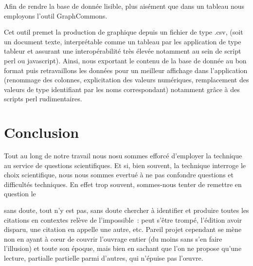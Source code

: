 \documentclass[12pt, a4paper]{article}
\begin{document}
Afin de rendre la base de donnée lisible, plus aisément que dans un tableau nous employons l'outil GraphCommons.

Cet outil premet la production de graphique depuis un fichier de type .csv, (soit un document texte, interprétable comme un tableau par les application de type tableur et assurant une interopérabilité très élevée notamment au sein de script perl ou javascript). Ainsi, nous exportant le contenu de la base de donnée au bon format puis retravaillons les données pour un meilleur affichage dans l'application (renommage des colonnes, explicitation des valeurs numériques, remplacement des valeurs de type identifiant par les noms correspondant) notamment grâce à des scripts perl rudimentaires.









\section{Conclusion}

Tout au long de notre travail nous nosu sommes efforcé d'employer la technique au service de questions scientifiques. Et si, bien souvent, la technique interroge le choix scientifique, nous nous sommes evertué à ne pas confondre questions et difficultés techniques. En effet trop souvent, sommes-nous tenter de remettre en question le 

sans doute, tout n'y est pas, sans doute chercher à identifier et produire toutes les citations en contextes relève de l'impossible : \robbe{} peut s'être trompé, l'édition avoir disparu, une citation en appelle une autre, etc. Pareil projet cependant se mène non en ayant à cœur de couvrir l'ouvrage entier (du moins sans s'en faire l'illusion) et toute son époque, mais bien en sachant que l'on ne propose qu'une lecture, partialle partielle parmi d'autres,  qui n'épuise pas l'œuvre.

\end{document}
